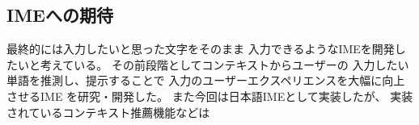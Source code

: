 \subsection{IMEへの期待}
最終的には入力したいと思った文字をそのまま
入力できるようなIMEを開発したいと考えている。
その前段階としてコンテキストからユーザーの
入力したい単語を推測し、提示することで
入力のユーザーエクスペリエンスを大幅に向上させるIME
を研究・開発した。
また今回は日本語IMEとして実装したが、
実装されているコンテキスト推薦機能などは
